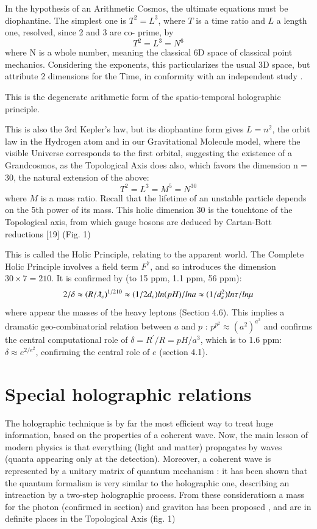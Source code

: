 \documentclass[twoside,draft]{article}
\begin{document}
\begin{sloppypar}
In the hypothesis of an Arithmetic Cosmos, the ultimate equations must be diophantine. The
simplest one is $T^{2} = L^{3}$, where $T$ is a time ratio and $L$ a length one, resolved, since 2 and 3 are co-
prime, by $$T^{2} = L^{3} = N^{6}$$ where N is a whole number, meaning the classical 6D space of classical point mechanics. Considering the exponents, this particularizes the usual 3D space, but attribute 2 dimensions for the Time, in conformity with an independent study \cite{Bars}.

This is the degenerate arithmetic form of the spatio-temporal holographic principle.

This is also the 3rd Kepler's law, but its diophantine form gives $L = n^{2}$, the orbit law in the Hydrogen atom and in our
Gravitational Molecule model, where the visible Universe corresponds to the first orbital,
suggesting the existence of a Grandcosmos, as the Topological Axis does also, which favors the
dimension n = 30, the natural extension of the above:
\begin{equation}
T^{2} = L^{3} = M^{5} = N^{30}
\end{equation}
where $M$ is a mass ratio. Recall that the lifetime of an unstable particle depends on the 5th power of its mass. This holic dimension 30 is the touchtone of the Topological axis, from which gauge bosons are deduced by Cartan-Bott reductions [19] (Fig. 1)

This is called the Holic Principle, relating to the apparent world. The Complete Holic
Principle involves a field term $F^{7}$, and so introduces the dimension $30 \times 7 = 210$. It is confirmed by (to 15 ppm, 1.1 ppm, 56 ppm):
$$2/\delta \approx (R/\lambdabar_{e})^{1/210} \approx (1/2d_{e}) ln(pH)/lna \approx (1/d_e^{2})ln\tau/ln\mu$$
where appear the masses of the heavy leptons (Section 4.6). This implies a dramatic geo-combinatorial relation between $a$ and $p$ : $p^{p^{2}} \approx (a^{2})^{a^{3}}$ and confirms the central computational role of $\delta = R^{\prime}/R = pH/a^{3}$, which is to 1.6 ppm:$\delta \approx e^{2/e^2}$, confirming the central role of $e$ (section 4.1).




\section{Special holographic relations}
The holographic technique is by far the most efficient way to treat huge information, based on the
properties of a coherent wave. Now, the main lesson of modern physics is that everything (light and matter) propagates by waves  (quanta appearing only at the detection). Moreover, a coherent wave is represented by a unitary matrix of quantum mechanism : it has been shown that the quantum formalism is very similar to the holographic one, describing an intreaction by a two-step holographic process. From these consideratiosn a mass for the photon (confirmed in section) and graviton has been proposed \cite{Sanchez1}, and are in definite places in the Topological Axis (fig. 1)


\end{sloppypar}
\end{document}
